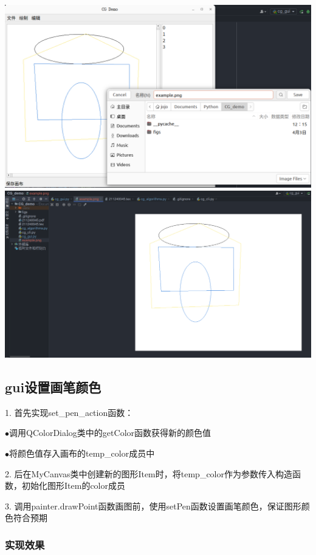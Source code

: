 \documentclass[a4paper,UTF8]{article}
\theoremstyle{definition}
\begin{document}
\begin{center}
	\includegraphics[width=6in]{figs/save.png}
	\includegraphics[width=6in]{figs/save_res.png}
\end{center}

\subsection{gui设置画笔颜色}

1. 首先实现set\_pen\_action函数：

$\bullet$调用QColorDialog类中的getColor函数获得新的颜色值

$\bullet$将颜色值存入画布的temp\_color成员中

2. 后在MyCanvas类中创建新的图形Item时，将temp\_color作为参数传入构造函数，初始化图形Item的color成员

3. 调用painter.drawPoint函数画图前，使用setPen函数设置画笔颜色，保证图形颜色符合预期

\subsubsection{实现效果}
\end{document}
